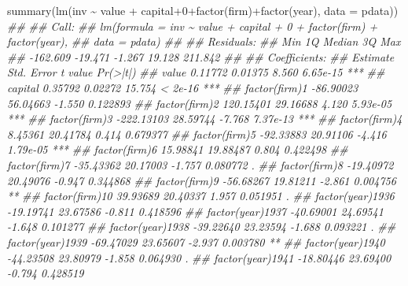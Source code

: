\documentclass[
  letterpaper,
  xelatex,
  ja=standard, xelatex]{bxjsbook}
\newenvironment{Shaded}{\begin{snugshade}}{\end{snugshade}}
\newcommand{\AttributeTok}[1]{\textcolor[rgb]{0.40,0.45,0.13}{#1}}
\newcommand{\DecValTok}[1]{\textcolor[rgb]{0.68,0.00,0.00}{#1}}
\newcommand{\DocumentationTok}[1]{\textcolor[rgb]{0.37,0.37,0.37}{\textit{#1}}}
\newcommand{\FunctionTok}[1]{\textcolor[rgb]{0.28,0.35,0.67}{#1}}
\newcommand{\NormalTok}[1]{\textcolor[rgb]{0.00,0.23,0.31}{#1}}
\newcommand{\SpecialCharTok}[1]{\textcolor[rgb]{0.37,0.37,0.37}{#1}}
\begin{document}
\begin{Shaded}
\begin{Highlighting}[]
\FunctionTok{summary}\NormalTok{(}\FunctionTok{lm}\NormalTok{(inv }\SpecialCharTok{\textasciitilde{}}\NormalTok{ value }\SpecialCharTok{+}\NormalTok{ capital}\SpecialCharTok{+}\DecValTok{0}\SpecialCharTok{+}\FunctionTok{factor}\NormalTok{(firm)}\SpecialCharTok{+}\FunctionTok{factor}\NormalTok{(year), }\AttributeTok{data =}\NormalTok{ pdata))}
\DocumentationTok{\#\# }
\DocumentationTok{\#\# Call:}
\DocumentationTok{\#\# lm(formula = inv \textasciitilde{} value + capital + 0 + factor(firm) + factor(year), }
\DocumentationTok{\#\#     data = pdata)}
\DocumentationTok{\#\# }
\DocumentationTok{\#\# Residuals:}
\DocumentationTok{\#\#      Min       1Q   Median       3Q      Max }
\DocumentationTok{\#\# {-}162.609  {-}19.471   {-}1.267   19.128  211.842 }
\DocumentationTok{\#\# }
\DocumentationTok{\#\# Coefficients:}
\DocumentationTok{\#\#                    Estimate Std. Error t value Pr(\textgreater{}|t|)    }
\DocumentationTok{\#\# value               0.11772    0.01375   8.560 6.65e{-}15 ***}
\DocumentationTok{\#\# capital             0.35792    0.02272  15.754  \textless{} 2e{-}16 ***}
\DocumentationTok{\#\# factor(firm)1     {-}86.90023   56.04663  {-}1.550 0.122893    }
\DocumentationTok{\#\# factor(firm)2     120.15401   29.16688   4.120 5.93e{-}05 ***}
\DocumentationTok{\#\# factor(firm)3    {-}222.13103   28.59744  {-}7.768 7.37e{-}13 ***}
\DocumentationTok{\#\# factor(firm)4       8.45361   20.41784   0.414 0.679377    }
\DocumentationTok{\#\# factor(firm)5     {-}92.33883   20.91106  {-}4.416 1.79e{-}05 ***}
\DocumentationTok{\#\# factor(firm)6      15.98841   19.88487   0.804 0.422498    }
\DocumentationTok{\#\# factor(firm)7     {-}35.43362   20.17003  {-}1.757 0.080772 .  }
\DocumentationTok{\#\# factor(firm)8     {-}19.40972   20.49076  {-}0.947 0.344868    }
\DocumentationTok{\#\# factor(firm)9     {-}56.68267   19.81211  {-}2.861 0.004756 ** }
\DocumentationTok{\#\# factor(firm)10     39.93689   20.40337   1.957 0.051951 .  }
\DocumentationTok{\#\# factor(year)1936  {-}19.19741   23.67586  {-}0.811 0.418596    }
\DocumentationTok{\#\# factor(year)1937  {-}40.69001   24.69541  {-}1.648 0.101277    }
\DocumentationTok{\#\# factor(year)1938  {-}39.22640   23.23594  {-}1.688 0.093221 .  }
\DocumentationTok{\#\# factor(year)1939  {-}69.47029   23.65607  {-}2.937 0.003780 ** }
\DocumentationTok{\#\# factor(year)1940  {-}44.23508   23.80979  {-}1.858 0.064930 .  }
\DocumentationTok{\#\# factor(year)1941  {-}18.80446   23.69400  {-}0.794 0.428519    }

\end{Highlighting}
\end{Shaded}
\end{document}
